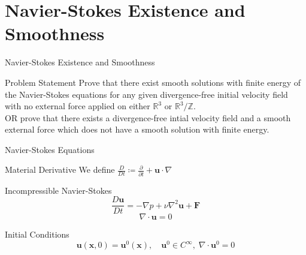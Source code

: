 \documentclass{beamer}
\newcommand{\Real}{\mathbb{R}}
\newcommand{\Integer}{\mathbb{Z}}
\begin{document}
  \section{Navier-Stokes Existence and Smoothness}
  \begin{frame}{Navier-Stokes Existence and Smoothness}
      \begin{block}{Problem Statement}
          Prove that there exist smooth solutions with finite energy of the
          Navier-Stokes equations for any given divergence-free initial
          velocity field with no external force applied on either $\Real^3$
          or $\Real^3/\Integer$.\pause\\
          OR prove that there exists a divergence-free
          intial velocity field and a smooth external force which does not
          have a smooth solution with finite energy.
      \end{block}
  \end{frame}
  \begin{frame}{Navier-Stokes Equations}
      \pause
      \begin{block}{Material Derivative}
          We define $\frac{D}{Dt} \coloneqq \frac{\partial}{\partial t} +
          \mathbf{u} \cdot \nabla$
      \end{block}
      \pause
      \begin{block}{Incompressible Navier-Stokes}
          $$
          \frac{D \mathbf{u}}{D t} = -\nabla p + \nu\nabla^2\mathbf{u} +
          \mathbf{F}
          $$\pause
          $$
          \nabla \cdot \mathbf{u} = 0
          $$
      \end{block}
      \pause
      \begin{block}{Initial Conditions}
          $$
          \mathbf{u}(\mathbf{x}, 0) = \mathbf{u}^0(\mathbf{x}), \quad
          \mathbf{u}^0 \in C^{\infty},\; \nabla \cdot \mathbf{u}^0 = 0
          $$
      \end{block}
  \end{frame}
\end{document}
